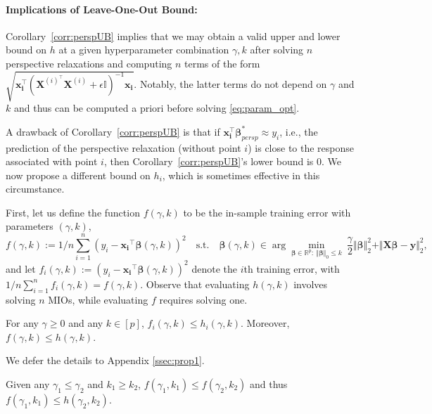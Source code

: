 \documentclass[opre,nonblindrev]{informs3} %
\begin{document}
\paragraph{Implications of Leave-One-Out Bound:}
Corollary~\ref{corr:perspUB} implies that we may obtain a valid upper and lower bound on $h$ at a given hyperparameter combination $\gamma, k$ after solving $n$ perspective relaxations and computing $n$ terms of the form $\sqrt{\bm{x_i^\top}\left(\bm{X}^{(i)^\top} \bm{X}^{(i)}+\epsilon\mathbb{I}\right)^{-1}\bm{x_i}}$. Notably, the latter terms do not depend on $\gamma$ and $k$ and thus can be computed a priori before solving \eqref{eq:param_opt}.

A drawback of Corollary~\ref{corr:perspUB} is that if $\bm{x_i^\top}\bm{\beta}_{persp}^*\approx y_i$, i.e., the prediction of the perspective relaxation (without point $i$) is close to the response associated with point $i$, then Corollary~\ref{corr:perspUB}'s lower bound is $0$. We now propose a different bound on $h_i$, which is sometimes effective in this circumstance. 

First, let us define the function $f(\gamma,k)$ to be the in-sample training error with parameters $(\gamma, k)$,
\begin{equation*}
f(\gamma,k) := 1/n \sum_{i=1}^n (y_i -\bm{x_i}^\top \bm{\beta}(\gamma, k))^2\quad
	\text{s.t.} \quad  \bm{\beta}(\gamma, k) \in \arg\min_{\bm{\beta} \in \mathbb{R}^p: \ \Vert \bm{\beta}\Vert_0 \leq k} \ \frac{\gamma}{2}\Vert \bm{\beta}\Vert_2^2 +\Vert \bm{X}\bm{\beta}-\bm{y}\Vert_2^2,
\end{equation*}
and let $f_i(\gamma, k):=\left(y_i -\bm{x_i}^\top \bm{\beta}(\gamma,k)\right)^2$ denote the $i$th training error, with $1/n \sum_{i=1}^n f_i(\gamma, k)=f(\gamma, k)$. Observe that evaluating $h(\gamma,k)$ involves solving $n$ MIOs, while evaluating $f$ requires solving one. 

\begin{proposition}\label{prop:LB}
	For any $\gamma\geq 0$ and any $k \in [p]$, $f_i(\gamma,k)\leq h_i(\gamma,k)$. Moreover, $f(\gamma, k) \leq h(\gamma, k)$.
\end{proposition}
We defer the details to Appendix \ref{ssec:prop1}.
\endproof


\begin{corollary}\label{corr1}
	Given any $\gamma_1\leq \gamma_2$ and $k_1\geq k_2$, $f(\gamma_1,k_1)\leq f(\gamma_2,k_2)$ and thus $f(\gamma_1,k_1)\leq h(\gamma_2,k_2)$. 
\end{corollary}
\end{document}
